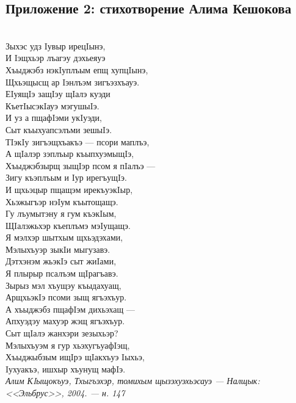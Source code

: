 \subsection{Приложение 2: стихотворение Алима Кешокова} \label{text}
{~}\medskip\\
\noindent Зыхэс удз Iувыр ирецIынэ,\\
И Iэщхьэр лъагэу дэхьеяуэ\\
Хъыджэбз нэкIуплъым епщ хупцIынэ,\\
Щхьэщысщ ар Iэнлъэм зигъэзхъауэ.\medskip\\
ЕIуящIэ защIэу щIалэ куэди\\
КъетIысэкIауэ мэгушыIэ.\\
И уз а пщафIэми укIуэди,\\
Сыт къыхуапсэлъми зешыIэ.\medskip\\
ТIэкIу зигъэщхъакъэ --- псори маплъэ,\\
А щIалэр зэплъыр къыпхуэмыщIэ,\\
Хъыджэбзырщ зыщIэр псом я пIалъэ ---\\
Зигу къэплъым и Iур ирегъущIэ.\medskip\\
И щхьэцыр пщащэм ирекъуэкIыр,\\
Хьэжыгъэр нэIум къытощащэ.\\
Гу лъумытэну я гум къэкIым,\\
ЩIалэжьхэр къеплъмэ мэIущащэ.\medskip\\
Я мэлхэр шытхым щхьэдэхами,\\
Мэлыхъуэр зыкIи мыгузавэ.\\
Дэтхэнэм жьэкIэ сыт жиIами,\\
Я плырыр псалъэм щIрагъавэ.\medskip\\
Зырыз мэл хъущэу къыдахуащ,\\
АрщхьэкIэ псоми зыщ ягъэхъур.\\
А хъыджэбз пщафIэм дихьэхащ --- \\
Апхуэдэу махуэр жэщ ягъэхъур. \medskip\\
Сыт щIалэ жанхэри зезыхьэр?\\
Мэлыхъуэм я гур хьэхугъуафIэщ,\\
Хъыджыбзым ищIрэ щIакхъуэ Iыхьэ,\\
Iухуакъэ, ишхыр хъунущ мафIэ.\medskip\\
\textit{Алим КIыщокъуэ, Тхыгъэхэр, томихым щызэхуэхьэсауэ ---  Налщык: <<Эльбрус>>, 2004. --- н. 147}
\pagebreak
